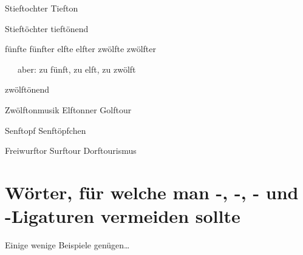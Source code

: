 Stieftochter Tiefton

Stieftöchter tieftönend

fünfte fünfter elfte elfter zwölfte zwölfter

\ \ \ aber: zu fünft, zu elft, zu zwölft

zwölftönend

Zwölftonmusik Elftonner Golftour

Senftopf Senftöpfchen

Freiwurftor Surftour Dorftourismus



\section*{Wörter, für welche man -, -, - und -Ligaturen vermeiden sollte}

Einige wenige Beispiele genügen\ldots


